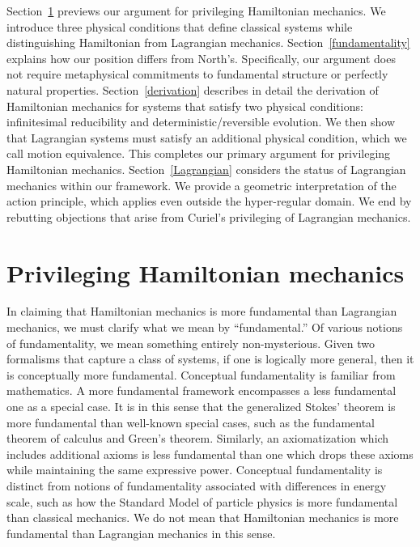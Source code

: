 \documentclass[12pt, english, twoside]{article} %
\begin{document}
Section~\ref{privileging} previews our argument for privileging Hamiltonian mechanics. We introduce three physical conditions that define classical systems while distinguishing Hamiltonian from Lagrangian mechanics. Section~\ref{fundamentality} explains how our position differs from North's. Specifically, our argument does not require metaphysical commitments to fundamental structure or perfectly natural properties. Section~\ref{derivation} describes in detail the derivation of Hamiltonian mechanics for systems that satisfy two physical conditions: infinitesimal reducibility and deterministic/reversible evolution. We then show that Lagrangian systems must satisfy an additional physical condition, which we call motion equivalence. This completes our primary argument for privileging Hamiltonian mechanics. Section~\ref{Lagrangian} considers the status of Lagrangian mechanics within our framework. We provide a geometric interpretation of the action principle, which applies even outside the hyper-regular domain. We end by rebutting objections that arise from Curiel's \parencites*[]{Curiel} privileging of Lagrangian mechanics. 




\section{Privileging Hamiltonian mechanics}
\label{privileging}

In claiming that Hamiltonian mechanics is more fundamental than Lagrangian mechanics, we must clarify what we mean by ``fundamental.'' Of various notions of fundamentality, we mean something entirely non-mysterious. Given two formalisms that capture a class of systems, if one is logically more general, then it is conceptually more fundamental. Conceptual fundamentality is familiar from mathematics. A more fundamental framework encompasses a less fundamental one as a special case. It is in this sense that the generalized Stokes' theorem is more fundamental than well-known special cases, such as the fundamental theorem of calculus and Green's theorem. Similarly, an axiomatization which includes additional axioms is less fundamental than one which drops these axioms while maintaining the same expressive power. Conceptual fundamentality is distinct from notions of fundamentality associated with differences in energy scale, such as how the Standard Model of particle physics is more fundamental than classical mechanics. We do not mean that Hamiltonian mechanics is more fundamental than Lagrangian mechanics in this sense.
\end{document}
